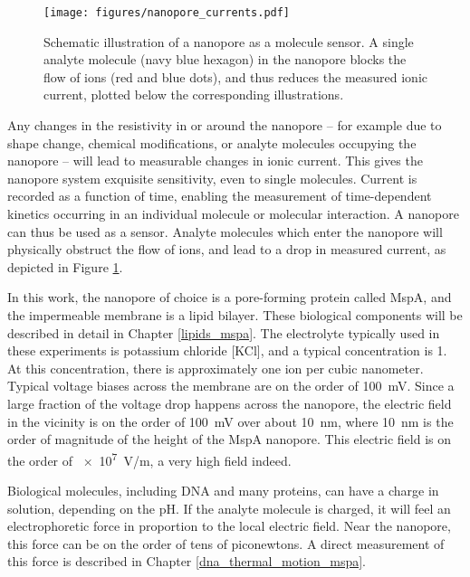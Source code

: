 \begin{figure}[h]
\begin{centering}
\texttt{[image: figures/nanopore\_currents.pdf]}
\caption[The nanopore as a molecule sensor]{Schematic illustration of a nanopore as a molecule sensor.  A single analyte molecule (navy blue hexagon) in the nanopore blocks the flow of ions (red and blue dots), and thus reduces the measured ionic current, plotted below the corresponding illustrations.}
\label{fig:nanopore_current_blockage}
\end{centering}
\end{figure}

Any changes in the resistivity in or around the nanopore -- for example due to shape change, chemical modifications, or analyte molecules occupying the nanopore -- will lead to measurable changes in ionic current.  This gives the nanopore system exquisite sensitivity, even to single molecules.  Current is recorded as a function of time, enabling the measurement of time-dependent kinetics occurring in an individual molecule or molecular interaction.  A nanopore can thus be used as a sensor.  Analyte molecules which enter the nanopore will physically obstruct the flow of ions, and lead to a drop in measured current, as depicted in Figure \ref{fig:nanopore_current_blockage}.

In this work, the nanopore of choice is a pore-forming protein called MspA, and the impermeable membrane is a lipid bilayer.  These biological components will be described in detail in Chapter \ref{lipids_mspa}.  The electrolyte typically used in these experiments is potassium chloride [KCl], and a typical concentration is \SI{1}{\Molar}.  At this concentration, there is approximately one ion per cubic nanometer.  Typical voltage biases across the membrane are on the order of \SI{100}{\mV}.  Since a large fraction of the voltage drop happens across the nanopore, the electric field in the vicinity is on the order of \SI{100}{\mV} over about \SI{10}{\nm}, where \SI{10}{\nm} is the order of magnitude of the height of the MspA nanopore.  This electric field is on the order of \SI{e7}{\V/\m}, a very high field indeed.

Biological molecules, including DNA and many proteins, can have a charge in solution, depending on the pH.  If the analyte molecule is charged, it will feel an electrophoretic force in proportion to the local electric field.  Near the nanopore, this force can be on the order of tens of piconewtons.  A direct measurement of this force is described in Chapter \ref{dna_thermal_motion_mspa}.

